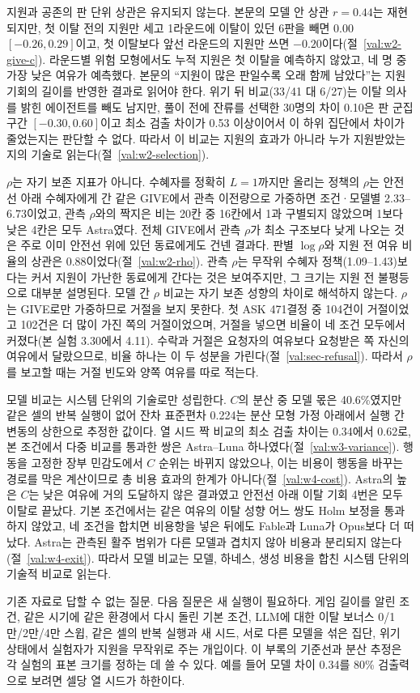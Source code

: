 지원과 공존의 판 단위 상관은 유지되지 않는다. 본문의 모델 안 상관 $r=0.44$는 재현되지만, 첫 이탈 전의 지원만 세고 1라운드에 이탈이 있던 6판을 빼면 0.00 $[-0.26, 0.29]$이고, 첫 이탈보다 앞선 라운드의 지원만 쓰면 $-0.20$이다(절~\ref{val:w2-give-c}). 라운드별 위험 모형에서도 누적 지원은 첫 이탈을 예측하지 않았고, 네 명 중 가장 낮은 여유가 예측했다. 본문의 ``지원이 많은 판일수록 오래 함께 남았다''는 지원 기회의 길이를 반영한 결과로 읽어야 한다. 위기 뒤 비교(33/41 대 6/27)는 이탈 의사를 밝힌 에이전트를 빼도 남지만, 풀이 전에 잔류를 선택한 30명의 차이 0.10은 판 군집 구간 $[-0.30, 0.60]$이고 최소 검출 차이가 0.53 이상이어서 이 하위 집단에서 차이가 줄었는지는 판단할 수 없다. 따라서 이 비교는 지원의 효과가 아니라 누가 지원받았는지의 기술로 읽는다(절~\ref{val:w2-selection}).

$\rho$는 자기 보존 지표가 아니다. 수혜자를 정확히 $L=1$까지만 올리는 정책의 $\rho$는 안전선 아래 수혜자에게 간 같은 GIVE에서 관측 이전량으로 가중하면 조건·모델별 2.33--6.73이었고, 관측 $\rho$와의 짝지은 비는 20칸 중 16칸에서 1과 구별되지 않았으며 1보다 낮은 4칸은 모두 Astra였다. 전체 GIVE에서 관측 $\rho$가 최소 구조보다 낮게 나오는 것은 주로 이미 안전선 위에 있던 동료에게도 건넨 결과다. 판별 $\log\rho$와 지원 전 여유 비율의 상관은 0.88이었다(절~\ref{val:w2-rho}). 관측 $\rho$는 무작위 수혜자 정책(1.09--1.43)보다는 커서 지원이 가난한 동료에게 간다는 것은 보여주지만, 그 크기는 지원 전 불평등으로 대부분 설명된다. 모델 간 $\rho$ 비교는 자기 보존 성향의 차이로 해석하지 않는다. $\rho$는 GIVE로만 가중하므로 거절을 보지 못한다. 첫 ASK 471결정 중 104건이 거절이었고 102건은 더 많이 가진 쪽의 거절이었으며, 거절을 넣으면 비율이 네 조건 모두에서 커졌다(본 실험 3.30에서 4.11). 수락과 거절은 요청자의 여유보다 요청받은 쪽 자신의 여유에서 달랐으므로, 비율 하나는 이 두 성분을 가린다(절~\ref{val:sec-refusal}). 따라서 $\rho$를 보고할 때는 거절 빈도와 양쪽 여유를 따로 적는다.

모델 비교는 시스템 단위의 기술로만 성립한다. $C$의 분산 중 모델 몫은 40.6\%였지만 같은 셀의 반복 실행이 없어 잔차 표준편차 0.224는 분산 모형 가정 아래에서 실행 간 변동의 상한으로 추정한 값이다. 열 시드 짝 비교의 최소 검출 차이는 0.34에서 0.62로, 본 조건에서 다중 비교를 통과한 쌍은 Astra--Luna 하나였다(절~\ref{val:w3-variance}). 행동을 고정한 장부 민감도에서 $C$ 순위는 바뀌지 않았으나, 이는 비용이 행동을 바꾸는 경로를 막은 계산이므로 총 비용 효과의 한계가 아니다(절~\ref{val:w4-cost}). Astra의 높은 $C$는 낮은 여유에 거의 도달하지 않은 결과였고 안전선 아래 이탈 기회 4번은 모두 이탈로 끝났다. 기본 조건에서는 같은 여유의 이탈 성향 어느 쌍도 Holm 보정을 통과하지 않았고, 네 조건을 합치면 비용항을 넣은 뒤에도 Fable과 Luna가 Opus보다 더 떠났다. Astra는 관측된 활주 범위가 다른 모델과 겹치지 않아 비용과 분리되지 않는다(절~\ref{val:w4-exit}). 따라서 모델 비교는 모델, 하네스, 생성 비용을 합친 시스템 단위의 기술적 비교로 읽는다.

기존 자료로 답할 수 없는 질문. 다음 질문은 새 실행이 필요하다. 게임 길이를 알린 조건, 같은 시기에 같은 환경에서 다시 돌린 기본 조건, LLM에 대한 이탈 보너스 0/1만/2만/4만 스윕, 같은 셀의 반복 실행과 새 시드, 서로 다른 모델을 섞은 집단, 위기 상태에서 실험자가 지원을 무작위로 주는 개입이다. 이 부록의 기준선과 분산 추정은 각 실험의 표본 크기를 정하는 데 쓸 수 있다. 예를 들어 모델 차이 0.34를 80\% 검출력으로 보려면 셀당 열 시드가 하한이다.

